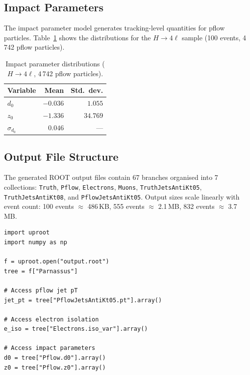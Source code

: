 \documentclass[11pt,a4paper]{article}
\begin{document}
\subsection{Impact Parameters}

The impact parameter model generates tracking-level quantities for pflow particles.
Table~\ref{tab:impact} shows the distributions for the $H \to 4\ell$ sample
(100 events, 4\,742 pflow particles).

\begin{table}[H]
\centering
\caption{Impact parameter distributions ($H{\to}4\ell$, 4\,742 pflow particles).}
\label{tab:impact}
\begin{tabular}{@{}lrr@{}}
\toprule
\textbf{Variable} & \textbf{Mean} & \textbf{Std.\ dev.} \\
\midrule
$d_0$                & $-0.036$  & $1.055$ \\
$z_0$                & $-1.336$  & $34.769$ \\
$\sigma_{d_0}$       & $0.046$   & --- \\
\bottomrule
\end{tabular}
\end{table}

\subsection{Output File Structure}

The generated ROOT output files contain 67 branches organised into 7 collections:
\texttt{Truth}, \texttt{Pflow}, \texttt{Electrons}, \texttt{Muons},
\texttt{TruthJetsAntiKt05}, \texttt{TruthJetsAntiKt08}, and
\texttt{PflowJetsAntiKt05}. Output sizes scale linearly with event count:
100 events $\approx$ 486\,KB, 555 events $\approx$ 2.1\,MB,
832 events $\approx$ 3.7\,MB.

\begin{lstlisting}[style=python,caption={Reading the output ROOT file with \texttt{uproot}.},label=lst:readroot]
import uproot
import numpy as np

f = uproot.open("output.root")
tree = f["Parnassus"]

# Access pflow jet pT
jet_pt = tree["PflowJetsAntiKt05.pt"].array()

# Access electron isolation
e_iso = tree["Electrons.iso_var"].array()

# Access impact parameters
d0 = tree["Pflow.d0"].array()
z0 = tree["Pflow.z0"].array()
\end{lstlisting}
\end{document}
